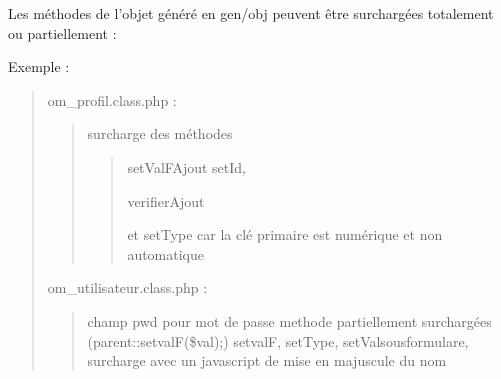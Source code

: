 \documentclass[letterpaper,10pt,french]{manual}
\begin{document}
Les méthodes de l'objet généré en gen/obj  peuvent être surchargées totalement ou partiellement :

Exemple :
\begin{quote}

om\_profil.class.php :
\begin{quote}

surcharge des méthodes
\begin{quote}

setValFAjout setId,

verifierAjout

et setType car la clé primaire est numérique et non automatique
\end{quote}
\end{quote}

om\_utilisateur.class.php :
\begin{quote}

champ pwd pour mot de passe  methode partiellement surchargées (parent::setvalF(\$val);) setvalF, setType, setValsousformulare, surcharge avec un javascript de mise en majuscule du nom
\end{quote}
\end{quote}
\end{document}
